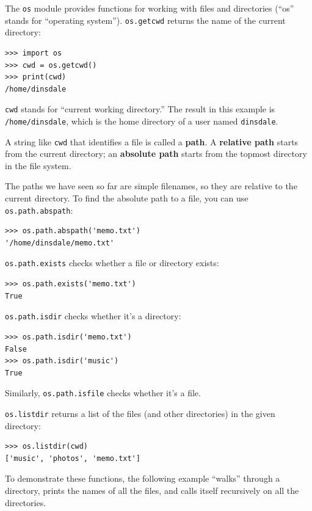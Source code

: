 \documentclass[10pt]{book}
\begin{document}
The {\tt os} module provides functions for working with files and
directories (``os'' stands for ``operating system'').  {\tt os.getcwd}
returns the name of the current directory:


\beforeverb
\begin{verbatim}
>>> import os
>>> cwd = os.getcwd()
>>> print(cwd)
/home/dinsdale
\end{verbatim}
\afterverb
%
{\tt cwd} stands for ``current working directory.''  The result in
this example is {\tt /home/dinsdale}, which is the home directory of a
user named {\tt dinsdale}.


A string like {\tt cwd} that identifies a file is called a {\bf path}.
A {\bf relative path} starts from the current directory;
an {\bf absolute path} starts from the topmost directory in the
file system.


The paths we have seen so far are simple filenames, so they are
relative to the current directory.  To find the absolute path to
a file, you can use {\tt os.path.abspath}:

\beforeverb
\begin{verbatim}
>>> os.path.abspath('memo.txt')
'/home/dinsdale/memo.txt'
\end{verbatim}
\afterverb
%
{\tt os.path.exists} checks
whether a file or directory exists:


\beforeverb
\begin{verbatim}
>>> os.path.exists('memo.txt')
True
\end{verbatim}
\afterverb
%
{\tt os.path.isdir} checks whether it's a directory:

\beforeverb
\begin{verbatim}
>>> os.path.isdir('memo.txt')
False
>>> os.path.isdir('music')
True
\end{verbatim}
\afterverb
%
Similarly, {\tt os.path.isfile} checks whether it's a file.

{\tt os.listdir} returns a list of the files (and other directories)
in the given directory:

\beforeverb
\begin{verbatim}
>>> os.listdir(cwd)
['music', 'photos', 'memo.txt']
\end{verbatim}
\afterverb
%
To demonstrate these functions, the following example
``walks'' through a directory, prints
the names of all the files, and calls itself recursively on
all the directories.
\end{document}
